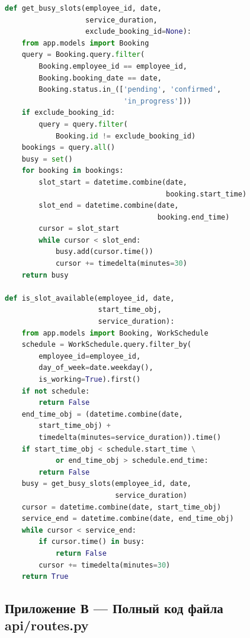 \documentclass[14pt,a4paper,oneside]{extarticle}
\begin{document}
\begin{lstlisting}[language=Python, caption={Вспомогательные функции (app/utils.py)}, label={lst:full_utils}]
def get_busy_slots(employee_id, date,
                   service_duration,
                   exclude_booking_id=None):
    from app.models import Booking
    query = Booking.query.filter(
        Booking.employee_id == employee_id,
        Booking.booking_date == date,
        Booking.status.in_(['pending', 'confirmed',
                            'in_progress']))
    if exclude_booking_id:
        query = query.filter(
            Booking.id != exclude_booking_id)
    bookings = query.all()
    busy = set()
    for booking in bookings:
        slot_start = datetime.combine(date,
                                      booking.start_time)
        slot_end = datetime.combine(date,
                                    booking.end_time)
        cursor = slot_start
        while cursor < slot_end:
            busy.add(cursor.time())
            cursor += timedelta(minutes=30)
    return busy

def is_slot_available(employee_id, date,
                      start_time_obj,
                      service_duration):
    from app.models import Booking, WorkSchedule
    schedule = WorkSchedule.query.filter_by(
        employee_id=employee_id,
        day_of_week=date.weekday(),
        is_working=True).first()
    if not schedule:
        return False
    end_time_obj = (datetime.combine(date,
        start_time_obj) +
        timedelta(minutes=service_duration)).time()
    if start_time_obj < schedule.start_time \
            or end_time_obj > schedule.end_time:
        return False
    busy = get_busy_slots(employee_id, date,
                          service_duration)
    cursor = datetime.combine(date, start_time_obj)
    service_end = datetime.combine(date, end_time_obj)
    while cursor < service_end:
        if cursor.time() in busy:
            return False
        cursor += timedelta(minutes=30)
    return True
\end{lstlisting}

\newpage
\subsection*{Приложение В --- Полный код файла api/routes.py}
\end{document}
